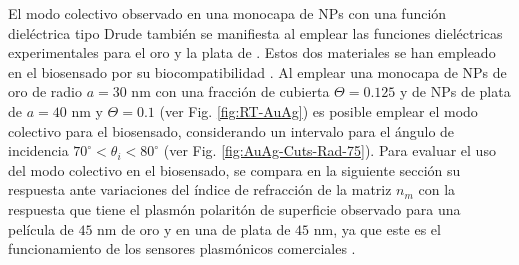 El modo colectivo observado en una monocapa de NPs con una función dieléctrica tipo Drude también se manifiesta al emplear las funciones dieléctricas experimentales para el oro y la plata de \cite{johnson1972constants}. Estos dos materiales se han empleado en el biosensado por su biocompatibilidad \cite{fan2009bio,bosetti2002silver}. Al emplear una monocapa de NPs de oro de radio $a=30$ nm con una fracción de cubierta $\Theta=0.125$ y de NPs de plata de $a=40$ nm y $\Theta=0.1$ (ver Fig. \ref{fig:RT-AuAg}) es posible emplear el modo colectivo para el biosensado, considerando un intervalo para el ángulo de incidencia $70^\circ<\theta_i<80^\circ$ (ver Fig. \ref{fig:AuAg-Cuts-Rad-75}). Para evaluar el uso del modo colectivo en el biosensado, se compara en la siguiente sección su respuesta ante variaciones del índice de refracción de la matriz $n_m$ con la respuesta que tiene el plasmón polaritón de superficie observado para una película de $45$ nm de oro y en una de plata de $45$ nm, ya que este es el funcionamiento de los sensores plasmónicos comerciales \cite{kabashin2009plasmonic,estevez2014trends}. 
